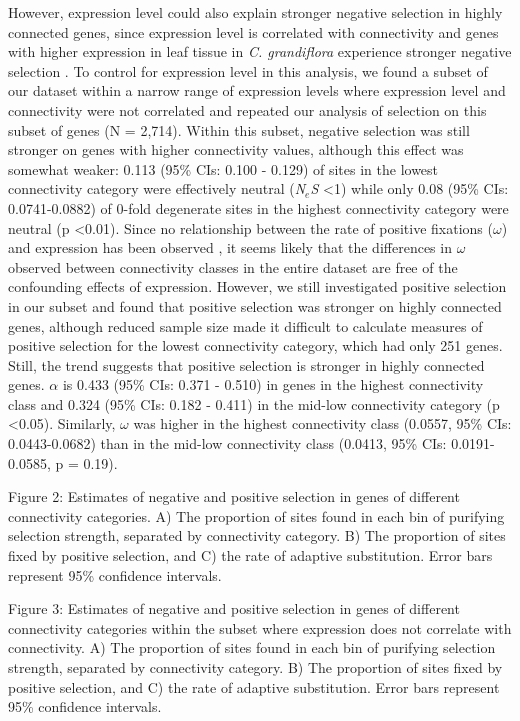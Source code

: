 However, expression level could also explain stronger negative selection in highly connected genes, since expression level is correlated with connectivity and genes with higher expression in leaf tissue in \textit{C. grandiflora} experience stronger negative selection \citep{Williamson2014-tf}. To control for expression level in this analysis, we found a subset of our dataset within a narrow range of expression levels where expression level and connectivity were not correlated and repeated our analysis of selection on this subset of genes (N = 2,714). Within this subset, negative selection was still stronger on genes with higher connectivity values, although this effect was somewhat weaker: 0.113 (95\% CIs: 0.100 - 0.129) of sites in the lowest connectivity category were effectively neutral (\textit{N$_{e}$S} \textless 1) while only 0.08 (95\% CIs: 0.0741-0.0882) of 0-fold degenerate sites in the highest connectivity category were neutral (p \textless 0.01). 
Since no relationship between the rate of positive fixations ($\omega$) and expression has been observed \citep{Williamson2014-tf}, it seems likely that the differences in $\omega$ observed between connectivity classes in the entire dataset are free of the confounding effects of expression. However, we still investigated positive selection in our subset and found that positive selection was stronger on highly connected genes, although reduced sample size made it difficult to calculate measures of positive selection for the lowest connectivity category, which had only 251 genes. Still, the trend suggests that positive selection is stronger in highly connected genes. $\alpha$ is 0.433 (95\% CIs: 0.371 - 0.510) in genes in the highest connectivity class and 0.324 (95\% CIs: 0.182 - 0.411) in the mid-low connectivity category (p \textless 0.05). Similarly, $\omega$ was higher in the highest connectivity class (0.0557, 95\% CIs: 0.0443-0.0682) than in the mid-low connectivity class (0.0413, 95\% CIs: 0.0191-0.0585, p = 0.19). 


Figure 2: Estimates of negative and positive selection in genes of different connectivity categories. A) The proportion of sites found in each bin of purifying selection strength, separated by connectivity category. B) The proportion of sites fixed by positive selection, and C) the rate of adaptive substitution. Error bars represent 95\% confidence intervals.


Figure 3: Estimates of negative and positive selection in genes of different connectivity categories within the subset where expression does not correlate with connectivity. A) The proportion of sites found in each bin of purifying selection strength, separated by connectivity category. B) The proportion of sites fixed by positive selection, and C) the rate of adaptive substitution. Error bars represent 95\% confidence intervals.


